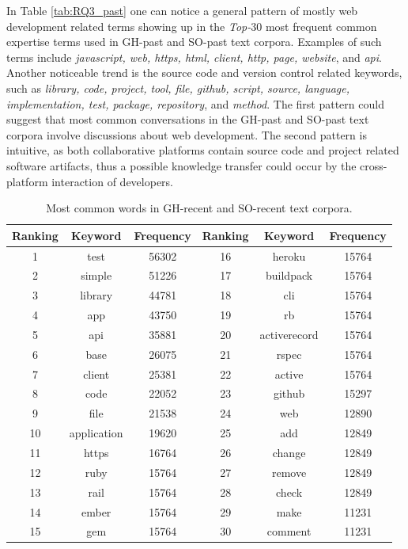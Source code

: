         In Table \ref{tab:RQ3_past} one can notice a general pattern of mostly web development related terms showing up in the \emph{Top-$30$} most frequent common expertise terms used in GH-past and SO-past text corpora. Examples of such terms include \emph{javascript, web, https, html, client, http, page, website}, and \emph{api}. Another noticeable trend is the source code and version control related keywords, such as \emph{library, code, project, tool, file, github, script, source, language, implementation, test, package, repository}, and \emph{method}. The first pattern could suggest that most common conversations in the GH-past and SO-past text corpora involve discussions about web development. The second pattern is intuitive, as both collaborative platforms contain source code and project related software artifacts, thus a possible knowledge transfer could occur by the cross-platform interaction of developers. 
        
        \begin{table}
          \centering
          \caption{Most common words in GH-recent and SO-recent text corpora.}\label{tab:RQ3_recent}
            \vspace{6pt} %
          \begin{tabular}{|c c c | c c c|}
            \hline
            Ranking & Keyword & Frequency & Ranking & Keyword & Frequency \\
            \hline\hline
            1 & test & 56302 & 16 & heroku & 15764 \\
            2 & simple & 51226 & 17 & buildpack & 15764 \\
            3 & library & 44781 & 18 & cli & 15764 \\
            4 & app & 43750 & 19 & rb & 15764 \\
            5 & api & 35881 & 20 & activerecord & 15764 \\
            6 & base & 26075 & 21 & rspec & 15764 \\
            7 & client & 25381 & 22 & active & 15764 \\
            8 & code & 22052 & 23 & github & 15297 \\
            9 & file & 21538 & 24 & web & 12890 \\
            10 & application & 19620 & 25 & add & 12849 \\
            11 & https & 16764 & 26 & change & 12849\\
            12 & ruby & 15764  & 27 & remove & 12849 \\
            13 & rail & 15764 & 28 & check & 12849\\
            14 & ember & 15764 & 29 & make & 11231 \\
            15 & gem & 15764 & 30 & comment & 11231\\
            \hline
          \end{tabular}
        \end{table}
        

